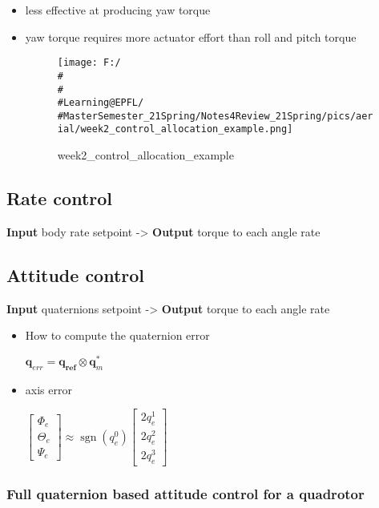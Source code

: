 \documentclass[]{article}
\begin{document}
\begin{itemize}
\item
  less effective at producing yaw torque
\item
  yaw torque requires more actuator effort than roll and pitch torque

  \begin{figure}
  \centering
  \texttt{[image: F:/\\\#\\\#\\\#Learning@EPFL/\\\#MasterSemester\_21Spring/Notes4Review\_21Spring/pics/aerial/week2\_control\_allocation\_example.png]}
  \caption{week2\_control\_allocation\_example}
  \end{figure}
\end{itemize}

\subsection{Rate control}\label{header-n644}

\textbf{Input} body rate setpoint -\textgreater{} \textbf{Output} torque
to each angle rate

\subsection{Attitude control}\label{header-n646}

\textbf{Input} quaternions setpoint -\textgreater{} \textbf{Output}
torque to each angle rate

\begin{itemize}
\item
  How to compute the quaternion error

  \(\boldsymbol{q}_{e r r}=\boldsymbol{q}_{\boldsymbol{r e f}} \otimes \boldsymbol{q}_{m}^{*}\)
\item
  axis error

  \(\left[\begin{array}{c}
  \Phi_{e} \\
  \Theta_{e} \\
  \Psi_{e}
  \end{array}\right] \approx \operatorname{sgn}\left(q_{e}^{0}\right)\left[\begin{array}{l}
  2 q_{e}^{1} \\
  2 q_{e}^{2} \\
  2 q_{e}^{3}
  \end{array}\right]\)
\end{itemize}

\subsubsection{Full quaternion based attitude control for a
quadrotor}\label{header-n655}
\end{document}
